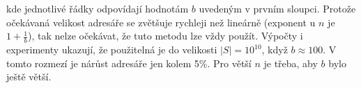 \documentclass[a4paper,12pt]{article}
\begin{document}
kde jednotlivé řádky odpovídají hodnotám $
b$ 
uvedeným v prv\-ním sloupci. Protože očekávaná velikost 
adresáře se zvětšu\-je rychleji než lineárně (exponent u $
n$ je $1+\frac 1b$), 
tak nelze očekávat, že tuto metodu lze vždy použít. 
Výpočty i expe\-ri\-menty uka\-zu\-jí, že použitelná je do 
velikosti $|S|=10^{10}$, když $b\approx 100$. V tomto rozmezí je 
nárůst adresáře jen kolem 5\%. Pro větší $
n$ je 
třeba, aby $b$ bylo ještě větší.
\end{document}
